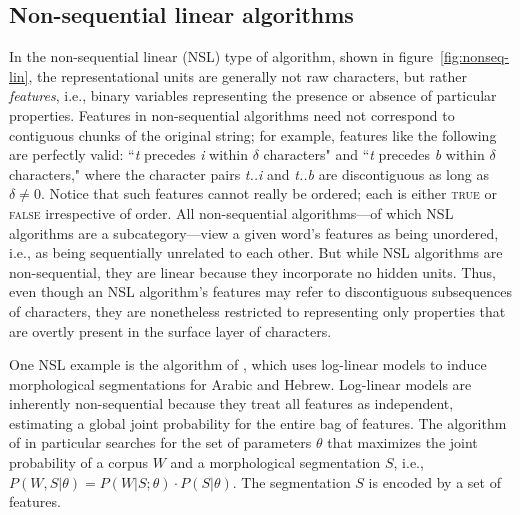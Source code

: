 
\subsection{Non-sequential linear algorithms}
\label{subsec:nonseq-lin}
In the non-sequential linear (NSL) type of algorithm, shown in figure~\ref{fig:nonseq-lin}, the representational units are generally not raw characters, but rather \emph{features}, i.e., binary variables representing the presence or absence of particular properties.
Features in non-sequential algorithms need not correspond to contiguous chunks of the original string; for example, features like the following are perfectly valid: ``\textit{t} precedes \textit{i} within $\delta$ characters" and ``\textit{t} precedes \textit{b} within $\delta$ characters," where the character pairs \emph{t..i} and \emph{t..b} are discontiguous as long as $\delta \ne 0$. Notice that such features cannot really be ordered; each is either \textsc{true} or \textsc{false} irrespective of order.
All non-sequential algorithms---of which NSL algorithms are a subcategory---view a given word's features as being unordered, i.e., as being sequentially unrelated to each other. 
But while NSL algorithms are non-sequential, they are linear because they incorporate no hidden units. Thus, even though an NSL algorithm's features may refer to discontiguous subsequences of characters, they are nonetheless restricted to representing only properties that are overtly present in the surface layer of characters. 

One NSL example is the algorithm of \cite{poon-et-al:2009}, which uses log-linear models to induce morphological segmentations for Arabic and Hebrew. 
Log-linear models are inherently non-sequential because they treat all features as independent, estimating a global joint probability for the entire bag of features. 
The algorithm of \cite{poon-et-al:2009} in particular searches for the set of parameters $\theta$ that maximizes the joint probability of a corpus $W$ and a morphological segmentation $S$, i.e., $P(W,S| \theta) = P(W|S; \theta) \cdot P(S| \theta)$. The segmentation $S$ is encoded by a set of features.

